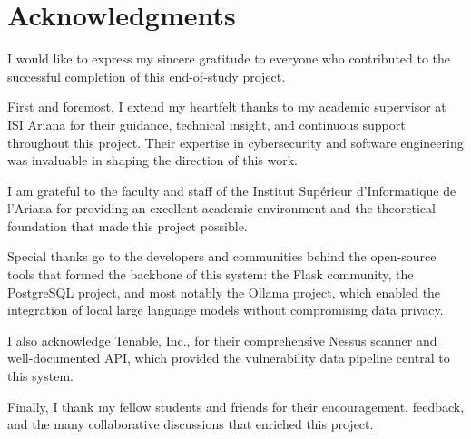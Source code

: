 \chapter*{Acknowledgments}
\thispagestyle{plain}

I would like to express my sincere gratitude to everyone who contributed to the successful completion of this end-of-study project.

First and foremost, I extend my heartfelt thanks to my academic supervisor at ISI Ariana for their guidance, technical insight, and continuous support throughout this project. Their expertise in cybersecurity and software engineering was invaluable in shaping the direction of this work.

I am grateful to the faculty and staff of the Institut Supérieur d'Informatique de l'Ariana for providing an excellent academic environment and the theoretical foundation that made this project possible.

Special thanks go to the developers and communities behind the open-source tools that formed the backbone of this system: the Flask community, the PostgreSQL project, and most notably the Ollama project, which enabled the integration of local large language models without compromising data privacy.

I also acknowledge Tenable, Inc., for their comprehensive Nessus scanner and well-documented API, which provided the vulnerability data pipeline central to this system.

Finally, I thank my fellow students and friends for their encouragement, feedback, and the many collaborative discussions that enriched this project.
\cleardoublepage
